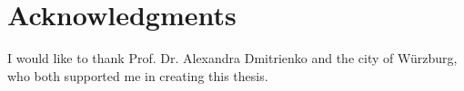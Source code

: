 \chapter{Acknowledgments}
\label{ch:Acknowledgments}
I would like to thank Prof. Dr. Alexandra Dmitrienko and the city of Würzburg, who both supported me in creating this thesis.
